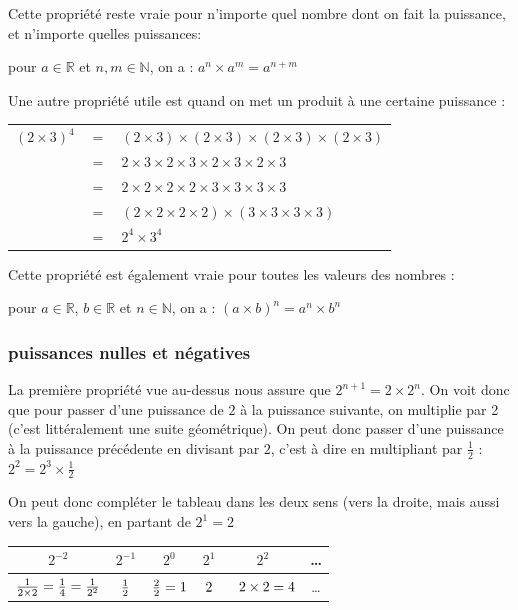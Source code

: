 \documentclass[10pt,a4paper]{book}
\newcommand{\N}{\mathbb{N}}
\newcommand{\R}{\mathbb{R}}
\begin{document}
Cette propriété reste vraie pour n'importe quel nombre dont on fait la puissance, et n'importe quelles puissances:

\begin{prop}
    pour $a \in \R$ et $n,m \in \N$, on a :   $a^n \times a^m = a^{n+m}$
\end{prop}


Une autre propriété utile est quand on met un produit à une certaine puissance :

\begin{tabular}{rcl}
$(2 \times 3)^4$&$ =$&$ (2 \times 3)  \times (2 \times 3)  \times (2 \times 3) \times (2 \times 3)$ \\
& $=$ & $2 \times 3  \times 2 \times 3  \times 2 \times 3 \times 2 \times 3$ \\
& $=$ & $2 \times 2  \times 2 \times 2  \times 3 \times 3 \times 3 \times 3$\\
& $=$ & $(2 \times 2  \times 2 \times 2)  \times (3 \times 3 \times 3 \times 3)$\\
& $=$ & $2^4  \times 3^4$\\
\end{tabular}

Cette propriété est également vraie pour toutes les valeurs des nombres :

\begin{prop}
    pour $a \in \R$, $b \in \R$ et $n \in \N$, on a :   $(a \times b)^n = a^{n} \times b^n$
\end{prop}

\subsubsection{puissances nulles et négatives} 

La première propriété vue au-dessus nous assure que $2^{n+1} = 2 \times 2^n$. 
On voit donc que pour passer d'une puissance de $2$ à la puissance suivante, on multiplie par 2 (c'est littéralement une suite géométrique). 
On peut donc passer d'une puissance à la puissance précédente en divisant par $2$, c'est à dire en multipliant par $\frac{1}{2}$ : $2^2 = 2^3 \times \frac{1}{2}$

On peut donc compléter le tableau dans les deux sens (vers la droite, mais aussi vers la gauche), en partant de $2^1=2$ 

{
\centering
    \begin{tabular}{|c|c|c|c|c|c|}
        \hline
        $2^{-2}$ & $2^{-1}$ & $2^0$ & $2^1$  & $2^2$ & \ldots \\
        \hline
         $\frac{1}{2\times 2} = \frac{1}{4} = \frac{1}{2^2}\insertph{n1}$ & $\insertph{n2}\frac{1}{2}\insertph{n3}$ & $\insertph{n4}\frac{2}{2}=1\insertph{n5}$ & $\insertph{n6}2\insertph{n7}$ &  \ $\insertph{n8}2 \times 2 = 4$  & \ldots \\ 
        \hline
    \end{tabular}\par
}
\end{document}
